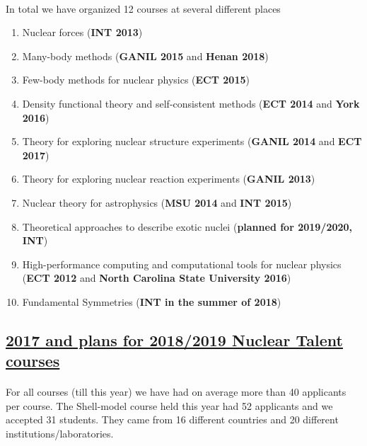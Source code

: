 \documentclass[%
oneside,                 %
final,                   %
10pt]{article}
\begin{document}
\paragraph{}
In total we have organized 12 courses at several different places
\begin{enumerate}
\item Nuclear forces (\textbf{INT 2013})

\item Many-body methods (\textbf{GANIL 2015} and  \textbf{Henan 2018})

\item Few-body methods for nuclear physics (\textbf{ECT 2015})

\item Density functional theory and self-consistent methods (\textbf{ECT 2014} and \textbf{York 2016})

\item Theory for exploring nuclear structure experiments (\textbf{GANIL 2014} and \textbf{ECT 2017})

\item Theory for exploring nuclear reaction experiments (\textbf{GANIL 2013})

\item Nuclear theory for astrophysics (\textbf{MSU 2014} and \textbf{INT 2015})

\item Theoretical approaches to describe  exotic nuclei (\textbf{planned for 2019/2020, INT})

\item High-performance computing and computational tools for nuclear physics (\textbf{ECT 2012} and \textbf{North Carolina State University 2016})

\item Fundamental Symmetries (\textbf{INT in the summer of 2018})
\end{enumerate}

\noindent




\subsection{\href{{http://fribtheoryalliance.org/TALENT/courses/courses.php}}{2017 and plans for 2018/2019 Nuclear Talent courses}}

\paragraph{}
For all courses (till this year) we have had on average more than 40 applicants per course. The Shell-model course held this year had 52 applicants and we accepted 31 students. They came from 16 different countries and 20 different institutions/laboratories.
\end{document}
